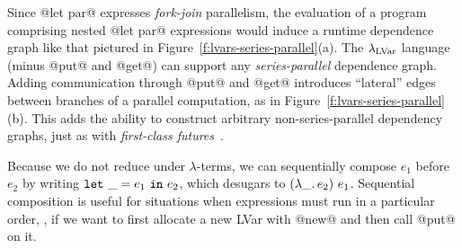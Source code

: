 Since @let par@ expresses \emph{fork-join} parallelism, the evaluation
of a program comprising nested @let par@ expressions would induce a
runtime dependence graph like that pictured in
Figure~\ref{f:lvars-series-parallel}(a).  The $\lambda_{\textrm{LVar}}$ language
(minus @put@ and @get@) can support any \emph{series-parallel}
dependence graph.  Adding communication through @put@ and @get@
introduces ``lateral'' edges between branches of a parallel
computation, as in Figure~\ref{f:lvars-series-parallel}(b).  This adds
the ability to construct arbitrary non-series-parallel dependency
graphs, just as with \emph{first-class
  futures}~\cite{beyond-nested-workstealing}.

Because we do not reduce under $\lambda$-terms, we can sequentially
compose $e_1$ before $e_2$ by writing $\mbox{\texttt{let}}~\_=e_1~\mbox{\texttt{in}}~e_2$, which
desugars to $(\lambda\_.\,e_2)~e_1$.  Sequential composition is
useful for situations when expressions must run in a particular order,
\eg, if we want to first allocate a new LVar with @new@ and then call
@put@ on it.

